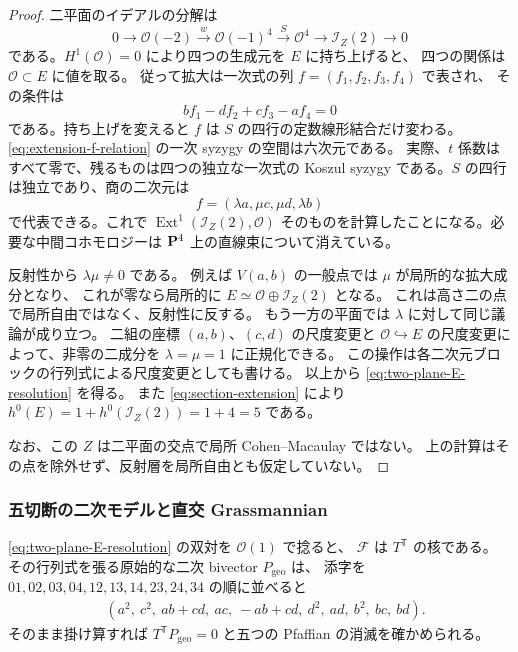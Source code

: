 \begin{proof}
二平面のイデアルの分解は
\[
 0\longrightarrow\mathcal O(-2)\xrightarrow{w}\mathcal O(-1)^4
 \xrightarrow{S}\mathcal O^4\longrightarrow\mathcal I_Z(2)
 \longrightarrow0
\]
である。$H^1(\mathcal O)=0$ により四つの生成元を $E$ に持ち上げると、
四つの関係は $\mathcal O\subset E$ に値を取る。
従って拡大は一次式の列 $f=(f_1,f_2,f_3,f_4)$ で表され、
その条件は
\begin{equation}
 bf_1-df_2+cf_3-af_4=0
 \label{eq:extension-f-relation}
\end{equation}
である。持ち上げを変えると $f$ は $S$ の四行の定数線形結合だけ変わる。
\eqref{eq:extension-f-relation} の一次 syzygy の空間は六次元である。
実際、$t$ 係数はすべて零で、残るものは四つの独立な一次式の
Koszul syzygy である。$S$ の四行は独立であり、商の二次元は
\begin{equation}
 f=(\lambda a,\mu c,\mu d,\lambda b)
 \label{eq:two-extension-parameters}
\end{equation}
で代表できる。これで $\operatorname{Ext}^1(\mathcal I_Z(2),\mathcal O)$
そのものを計算したことになる。必要な中間コホモロジーは
$\mathbf P^4$ 上の直線束について消えている。

反射性から $\lambda\mu\neq0$ である。
例えば $V(a,b)$ の一般点では $\mu$ が局所的な拡大成分となり、
これが零なら局所的に $E\simeq\mathcal O\oplus\mathcal I_Z(2)$ となる。
これは高さ二の点で局所自由ではなく、反射性に反する。
もう一方の平面では $\lambda$ に対して同じ議論が成り立つ。
二組の座標 $(a,b)$、$(c,d)$ の尺度変更と $\mathcal O\hookrightarrow E$
の尺度変更によって、非零の二成分を $\lambda=\mu=1$ に正規化できる。
この操作は各二次元ブロックの行列式による尺度変更としても書ける。
以上から \eqref{eq:two-plane-E-resolution} を得る。
また \eqref{eq:section-extension} により
$h^0(E)=1+h^0(\mathcal I_Z(2))=1+4=5$ である。

なお、この $Z$ は二平面の交点で局所 Cohen--Macaulay ではない。
上の計算はその点を除外せず、反射層を局所自由とも仮定していない。
\end{proof}

\subsubsection{五切断の二次モデルと直交 Grassmannian}

\eqref{eq:two-plane-E-resolution} の双対を $\mathcal O(1)$ で捻ると、
$\mathcal F$ は $T^{\mathsf T}$ の核である。
その行列式を張る原始的な二次 bivector $P_{\mathrm{geo}}$ は、
添字を $01,02,03,04,12,13,14,23,24,34$ の順に並べると
\begin{equation}
 \begin{split}
 &(a^2,\ c^2,\ ab+cd,\ ac,\ -ab+cd,\ d^2,\ ad,\ b^2,\ bc,\ bd).
 \end{split}
 \label{eq:geometric-ten-quadrics}
\end{equation}
そのまま掛け算すれば $T^{\mathsf T}P_{\mathrm{geo}}=0$ と五つの
Pfaffian の消滅を確かめられる。

